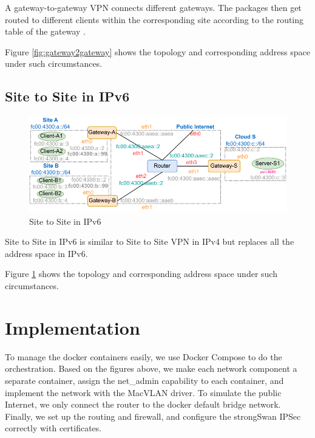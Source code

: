 \documentclass[article]{aaltoseries}
\begin{document}
A gateway-to-gateway VPN connects different gateways. The packages then get routed to different clients within the corresponding site according to the routing table of the gateway \cite{dulany2006performance}.

Figure \ref{fig:gateway2gateway} shows the topology and corresponding address space under such circumstances.

\subsection{Site to Site in IPv6}
\begin{figure}[t!]
  \begin{center}
    \includegraphics{figures/ipv6-site-to-site.pdf}
    \caption{Site to Site in IPv6}
    \label{fig:ipv6site2site}
  \end{center}
\end{figure}

Site to Site in IPv6 is similar to Site to Site VPN in IPv4 but replaces all the address space in IPv6.

Figure \ref{fig:ipv6site2site} shows the topology and corresponding address space under such circumstances.



\section{Implementation}

To manage the docker containers easily, we use Docker Compose to do the orchestration. Based on the figures above, we make each network component a separate container, assign the net\_admin capability to each container, and implement the network with the MacVLAN driver. To simulate the public Internet, we only connect the router to the docker default bridge network. Finally, we set up the routing and firewall, and configure the strongSwan IPSec correctly with certificates.
\end{document}
